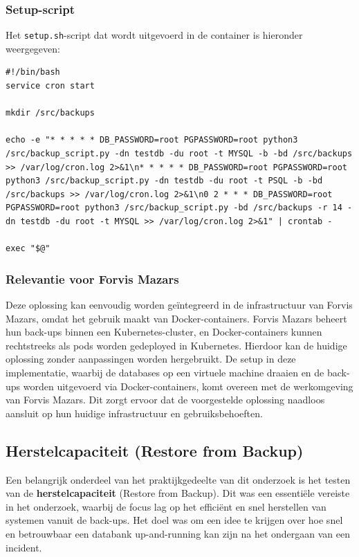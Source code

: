 \subsubsection{Setup-script}
Het \texttt{setup.sh}-script dat wordt uitgevoerd in de container is hieronder weergegeven:
\begin{lstlisting}[language=script, caption=Setup-script voor het configureren van cronjobs]
#!/bin/bash
service cron start

mkdir /src/backups

echo -e "* * * * * DB_PASSWORD=root PGPASSWORD=root python3 /src/backup_script.py -dn testdb -du root -t MYSQL -b -bd /src/backups >> /var/log/cron.log 2>&1\n* * * * * DB_PASSWORD=root PGPASSWORD=root python3 /src/backup_script.py -dn testdb -du root -t PSQL -b -bd /src/backups >> /var/log/cron.log 2>&1\n0 2 * * * DB_PASSWORD=root PGPASSWORD=root python3 /src/backup_script.py -bd /src/backups -r 14 -dn testdb -du root -t MYSQL >> /var/log/cron.log 2>&1" | crontab -

exec "$@"
\end{lstlisting}

\subsubsection{Relevantie voor Forvis Mazars}
Deze oplossing kan eenvoudig worden geïntegreerd in de infrastructuur van Forvis Mazars, omdat het gebruik maakt van Docker-containers. Forvis Mazars beheert hun back-ups binnen een Kubernetes-cluster, en Docker-containers kunnen rechtstreeks als pods worden gedeployed in Kubernetes. Hierdoor kan de huidige oplossing zonder aanpassingen worden hergebruikt. De setup in deze implementatie, waarbij de databases op een virtuele machine draaien en de back-ups worden uitgevoerd via Docker-containers, komt overeen met de werkomgeving van Forvis Mazars. Dit zorgt ervoor dat de voorgestelde oplossing naadloos aansluit op hun huidige infrastructuur en gebruiksbehoeften.


\subsection{Herstelcapaciteit (Restore from Backup)}
Een belangrijk onderdeel van het praktijkgedeelte van dit onderzoek is het testen van de \textbf{herstelcapaciteit} (Restore from Backup). Dit was een essentiële vereiste in het onderzoek, waarbij de focus lag op het efficiënt en snel herstellen van systemen vanuit de back-ups. Het doel was om een idee te krijgen over hoe snel en betrouwbaar een databank up-and-running kan zijn na het ondergaan van een incident.

